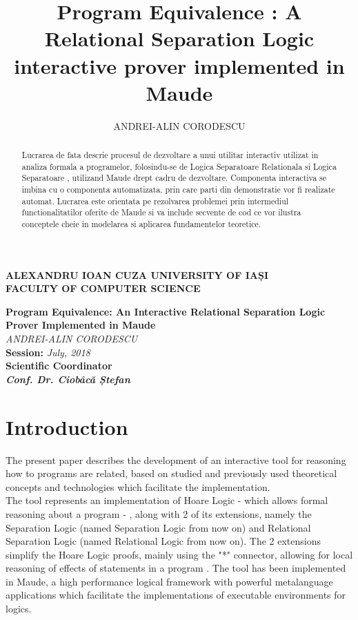 \documentclass[12pt,a4paper]{article}
\author{ANDREI-ALIN CORODESCU}
\title{Program Equivalence : A Relational Separation Logic interactive prover implemented in Maude}
\begin{document}
\begin{titlepage}
\begin{center}
\textbf{
ALEXANDRU IOAN CUZA UNIVERSITY OF IAȘI
}
\\
\textbf{FACULTY OF COMPUTER SCIENCE}
\end{center}
   \vspace{40mm}
\begin{center}
	\Large\textbf {Program Equivalence: An Interactive Relational Separation Logic Prover Implemented in Maude}\\
	\vspace{40mm}
	\large\textit {ANDREI-ALIN CORODESCU}
	\\
	\vspace{20mm}
	\textbf{Session: }\textit{July, 2018}\\
	\vspace{30mm}
	\textbf{Scientific Coordinator}\\
	\textbf{\textit{Conf. Dr. Ciobâcă Ștefan}}
	\vspace{30mm}
\end{center}
\end{titlepage}
\begin{abstract}
	Lucrarea de fata descrie procesul de dezvoltare a unui utilitar interactiv utilizat in analiza formala a programelor, folosindu-se de Logica Separatoare Relationala \cite{relational} si Logica Separatoare \cite{primer} \cite{SeparationLogic}, utilizand Maude \cite{maudesite} drept cadru de dezvoltare. Componenta interactiva se imbina cu o componenta automatizata, prin care parti din demonstratie vor fi realizate automat. Lucrarea este orientata pe rezolvarea problemei prin intermediul functionalitatilor oferite de Maude si va include secvente de cod ce vor ilustra conceptele cheie in modelarea si aplicarea fundamentelor teoretice.
\end{abstract}
\pagebreak
\tableofcontents
\pagebreak
\section*{Introduction}
The present paper describes the development of an interactive tool for reasoning how to programs are related, based on studied and previously used theoretical concepts and technologies which facilitate the implementation. \\

The tool represents an implementation of Hoare Logic - which allows formal reasoning about a program - , along  with 2 of its extensions, namely the Separation Logic (named Separation Logic from now on) and Relational Separation Logic \cite{relational} (named Relational Logic from now on). The 2 extensions simplify the Hoare Logic proofs, mainly using the "*" connector, allowing for local reasoning of effects of statements in a program . The tool has been implemented in Maude, a high performance logical framework with powerful metalanguage applications which facilitate the implementations of executable environments for logics.\\
\end{document}
